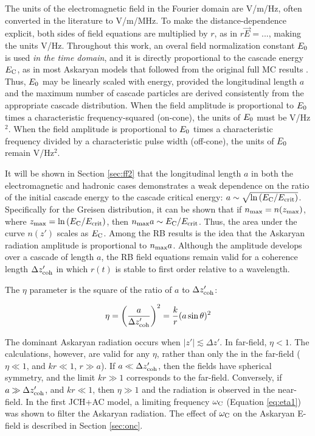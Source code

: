 \documentclass[amsmath,amssymb,aps,prd,10pt,twocolumn]{revtex4}
\begin{document}
The units of the electromagnetic field in the Fourier domain are V/m/Hz, often converted in the literature to V/m/MHz. To make the distance-dependence explicit, both sides of field equations are multiplied by $r$, as in $r\vec{E} = ... $, making the units V/Hz. Throughout this work, an overal field normalization constant $E_{\rm 0}$ is used \textit{in the time domain}, and it is directly proportional to the cascade energy $E_{\rm C}$, as in most Askaryan models that followed from the original full MC results \cite{zhs}. Thus, $E_{\rm 0}$ may be linearly scaled with energy, provided the longitudinal length $a$ and the maximum number of cascade particles are derived consistently from the appropriate cascade distribution.  When the field amplitude is proportional to $E_{\rm 0}$ times a characteristic frequency-squared (on-cone), the units of $E_{\rm 0}$ must be V/Hz$^2$.  When the field amplitude is proportional to $E_{\rm 0}$ times a characteristic frequency divided by a characteristic pulse width (off-cone), the units of $E_{\rm 0}$ remain V/Hz$^2$.

It will be shown in Section \ref{sec:ff2} that the longitudinal length $a$ in both the electromagnetic and hadronic cases demonstrates a weak dependence on the ratio of the initial cascade energy to the cascade critical energy: $a \sim \sqrt{\ln{(E_{\rm C}/E_{\rm crit})}}$.  Specifically for the Greisen distribution, it can be shown that if $n_{\rm max} = n(z_{\rm max})$, where $z_{\rm max} = \ln{(E_{\rm C}/E_{\rm crit})}$, then $n_{\rm max} a \sim E_{\rm C}/E_{\rm crit}$.  Thus, the area under the curve $n(z')$ scales as $E_{\rm C}$.  Among the RB results is the idea that the Askaryan radiation amplitude is proportional to $n_{\rm max} a$.  Although the amplitude develops over a cascade of length $a$, the RB field equations remain valid for a coherence length $\Delta z'_{\rm coh}$ in which $r(t)$ is stable to first order relative to a wavelength.

The $\eta$ parameter is the square of the ratio of $a$ to $\Delta z'_{\rm coh}$:

\begin{equation}
\eta = \left( \frac{a}{\Delta z'_{\rm coh}} \right)^2 = \frac{k}{r} (a\sin\theta)^2
\end{equation}

The dominant Askaryan radiation occurs when $|z'| \lesssim \Delta z'$.  In far-field, $\eta<1$.  The calculations, however, are valid for any $\eta$, rather than only the in the far-field ($\eta \ll 1$, and $kr \ll 1$, $r \gg a$). If $a \ll \Delta z'_{\rm coh}$, then the fields have spherical symmetry, and the limit $k r \gg 1$ corresponds to the far-field.  Conversely, if $a \gg \Delta z'_{\rm coh}$, and $kr \ll 1$, then $\eta \gg 1$ and the radiation is observed in the near-field.  In the first JCH+AC model, a limiting frequency $\omega_{\rm C}$ (Equation \ref{eq:eta1}) was shown to filter the Askaryan radiation.  The effect of $\omega_{\rm C}$ on the Askaryan E-field is described in Section \ref{sec:onc}.
\end{document}
